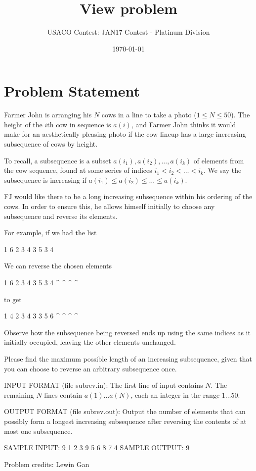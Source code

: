 \documentclass[12pt]{article}
\title{View problem}
\author{USACO Contest: JAN17 Contest - Platinum Division}
\date{\today}
\begin{document}
\maketitle

\section*{Problem Statement}

Farmer John is arranging his $N$ cows in a line to take a photo
($1 \leq N \leq 50$).  The height of the $i$th cow in sequence is $a(i)$, and
Farmer John thinks it would make for an aesthetically pleasing photo if the cow
lineup has a large increasing subsequence of cows by height.

To recall, a subsequence is a subset $a(i_1), a(i_2), \ldots, a(i_k)$ of
elements from the cow sequence, found at some series of indices
$i_1 < i_2 < \ldots < i_k$.  We say the subsequence is increasing if
$a(i_1) \leq a(i_2) \leq \ldots \leq a(i_k)$.  

FJ would like there to be a long increasing subsequence within his ordering of
the cows.   In order to ensure this, he allows himself initially to choose any
subsequence and reverse its elements.

For example, if we had the list

1 6 2 3 4 3 5 3 4

We can reverse the chosen elements

1 6 2 3 4 3 5 3 4
  ^         ^ ^ ^

to get

1 4 2 3 4 3 3 5 6
  ^         ^ ^ ^

Observe how the subsequence being reversed ends up using the same indices as it
initially occupied, leaving the other elements unchanged.  

Please find the maximum possible length of an increasing subsequence, given that
you can choose to reverse an arbitrary subsequence once.

INPUT FORMAT (file subrev.in):
The first line of input contains $N$. The remaining $N$ lines contain
$a(1) \ldots a(N)$, each an integer in the range $1 \ldots 50$.

OUTPUT FORMAT (file subrev.out):
Output the number of elements that can possibly form a longest increasing
subsequence after reversing the contents of at most one subsequence.

SAMPLE INPUT:
9
1
2
3
9
5
6
8
7
4
SAMPLE OUTPUT: 
9


Problem credits: Lewin Gan
\end{document}

